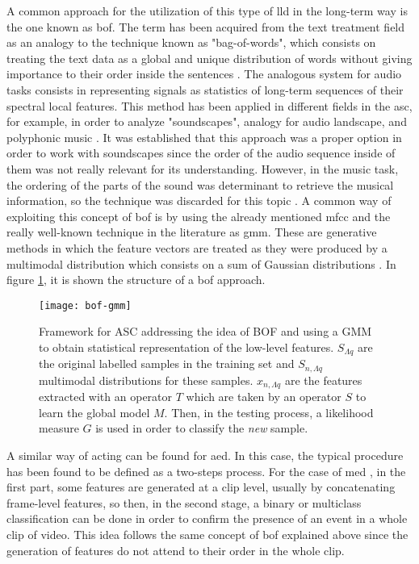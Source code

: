 	A common approach for the utilization of this type of \acrshort{lld} in the long-term way is the one known as \acrfull{bof}. The term has been acquired from the text treatment field as an analogy to the technique known as "bag-of-words", which consists on treating the text data as a global and unique distribution of words without giving importance to their order inside the sentences \cite{Uijlings2009}. The analogous system for audio tasks consists in representing signals as statistics of long-term sequences of their spectral local features. This method has been applied in different fields in the \acrshort{asc}, for example, in order to analyze "soundscapes", analogy for audio landscape, and polyphonic music \cite{Aucouturier2007}. It was established that this approach was a proper option in order to work with soundscapes since the order of the audio sequence inside of them was not really relevant for its understanding. However, in the music task, the ordering of the parts of the sound was determinant to retrieve the musical information, so the technique was discarded for this topic \cite{Aucouturier2009}. A common way of exploiting this concept of \acrshort{bof} is by using the already mentioned \acrshort{mfcc} and the really well-known technique in the literature as \acrshort{gmm}. These are generative methods in which the feature vectors are treated as they were produced by a multimodal distribution which consists on a sum of Gaussian distributions \cite{Barchiesi2015} . In figure \ref{fig:mesh53}, it is shown the structure of a \acrlong{bof} approach. 
	
	\begin{figure}[H]
		\centering
		\captionsetup{justification=centering}
		\texttt{[image: bof-gmm]}
		\caption{Framework for ASC addressing the idea of BOF and using a GMM to obtain statistical representation of the low-level features. $S_{\Lambda q} $ are the original labelled samples in the training set and $S_{n,\Lambda q}$ multimodal distributions for these samples. $x_{n,\Lambda q}$ are the features extracted with an operator $T$ which are taken by an operator $S$ to learn the global model $M$. Then, in the testing process, a likelihood measure $G$ is used in order to classify the \textit{new} sample.}
		\label{fig:mesh53}
	\end{figure}
	
	A similar way of acting can be found for \acrshort{aed}. In this case, the typical procedure has been found to be defined as a two-steps process. For the case of \acrfull{med} \cite{Wang2016}, in the first part, some features are generated at a clip level, usually by concatenating frame-level features, so then, in the second stage, a binary or multiclass classification can be done in order to confirm the presence of an event in a whole clip of video. This idea follows the same concept of \acrshort{bof} explained above since the generation of features do not attend to their order in the whole clip.
	
